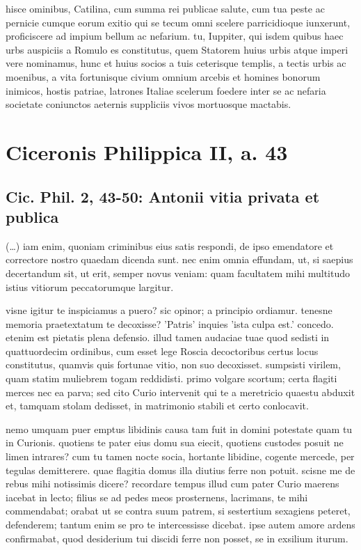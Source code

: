 hisce ominibus, Catilina, cum summa rei publicae salute, cum tua peste ac pernicie cumque eorum exitio qui se tecum omni scelere parricidioque iunxerunt, proficiscere ad impium bellum ac nefarium. tu, Iuppiter, qui isdem quibus haec urbs auspiciis a Romulo es constitutus, quem Statorem huius urbis atque imperi vere nominamus, hunc et huius socios a tuis ceterisque templis, a tectis urbis ac moenibus, a vita fortunisque civium omnium arcebis et homines bonorum inimicos, hostis patriae, latrones Italiae scelerum foedere inter se ac nefaria societate coniunctos aeternis suppliciis vivos mortuosque mactabis.

\section*{Ciceronis Philippica II, a. 43}

\subsection*{Cic. Phil. 2, 43-50: Antonii vitia privata et publica}


(\dots) iam enim, quoniam criminibus eius satis respondi, de ipso emendatore et correctore nostro quaedam dicenda sunt. nec enim omnia effundam, ut, si saepius decertandum sit, ut erit, semper novus veniam: quam facultatem mihi multitudo istius vitiorum peccatorumque largitur.

visne igitur te inspiciamus a puero? sic opinor; a principio ordiamur. tenesne memoria praetextatum te decoxisse? 'Patris' inquies 'ista culpa est.' concedo. etenim est pietatis plena defensio. illud tamen audaciae tuae quod sedisti in quattuordecim ordinibus, cum esset lege Roscia decoctoribus certus locus constitutus, quamvis quis fortunae vitio, non suo decoxisset. sumpsisti virilem, quam statim muliebrem togam reddidisti. primo volgare scortum; certa flagiti merces nec ea parva; sed cito Curio intervenit qui te a meretricio quaestu abduxit et, tamquam stolam dedisset, in matrimonio stabili et certo conlocavit.

nemo umquam puer emptus libidinis causa tam fuit in domini potestate quam tu in Curionis. quotiens te pater eius domu sua eiecit, quotiens custodes posuit ne limen intrares? cum tu tamen nocte socia, hortante libidine, cogente mercede, per tegulas demitterere. quae flagitia domus illa diutius ferre non potuit. scisne me de rebus mihi notissimis dicere? recordare tempus illud cum pater Curio maerens iacebat in lecto; filius se ad pedes meos prosternens, lacrimans, te mihi commendabat; orabat ut se contra suum patrem, si sestertium sexagiens peteret, defenderem; tantum enim se pro te intercessisse dicebat. ipse autem amore ardens confirmabat, quod desiderium tui discidi ferre non posset, se in exsilium iturum. 

